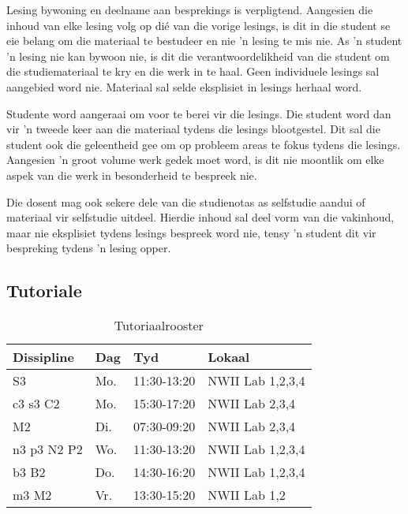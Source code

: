         Lesing bywoning en deelname aan besprekings is verpligtend.  Aangesien
        die inhoud van elke lesing volg op di\'{e} van die vorige lesings, is
        dit in die student se eie belang om die materiaal te bestudeer en nie
        'n lesing te mis nie. As 'n student 'n lesing nie kan bywoon nie, is
        dit die verantwoordelikheid van die student om die studiemateriaal te
        kry en die werk in te haal.  Geen individuele lesings sal aangebied
        word nie. Materiaal sal selde eksplisiet in lesings herhaal word.

        Studente word aangeraai om voor te berei vir die lesings. Die
        student word dan vir 'n tweede keer aan die materiaal tydens
        die lesings blootgestel. Dit sal die student ook die
        geleentheid gee om op probleem areas te fokus tydens die
        lesings. Aangesien 'n groot volume werk gedek moet word, is
        dit nie moontlik om elke aspek van die werk in besonderheid te
        bespreek nie.

        Die dosent mag ook sekere dele van die studienotas as selfstudie aandui
        of materiaal vir selfstudie uitdeel. Hierdie inhoud sal deel vorm van
        die vakinhoud, maar nie eksplisiet tydens lesings bespreek word nie,
        tensy 'n student dit vir bespreking tydens 'n lesing opper.

       \subsection{Tutoriale}
        \begin{table}[!h]
            \begin{center}
            \begin{tabular}{|l|l|l|l|}
                \hline
                {\bf Dissipline} & {\bf Dag} & {\bf Tyd} & {\bf Lokaal} \\
                \hline
                S3          & Mo.  & 11:30-13:20 & NWII Lab 1,2,3,4 \\
                c3 s3 C2    & Mo.  & 15:30-17:20 & NWII Lab 2,3,4 \\
                M2          & Di.  & 07:30-09:20 & NWII Lab 2,3,4 \\
                n3 p3 N2 P2 & Wo.  & 11:30-13:20 & NWII Lab 1,2,3,4 \\
                b3 B2       & Do.  & 14:30-16:20 & NWII Lab 1,2,3,4 \\
                m3 M2       & Vr.  & 13:30-15:20 & NWII Lab 1,2 \\
                \hline
            \end{tabular}
            \caption{Tutoriaalrooster}
            \label{tab:tutorials}
            \end{center}
        \end{table}

